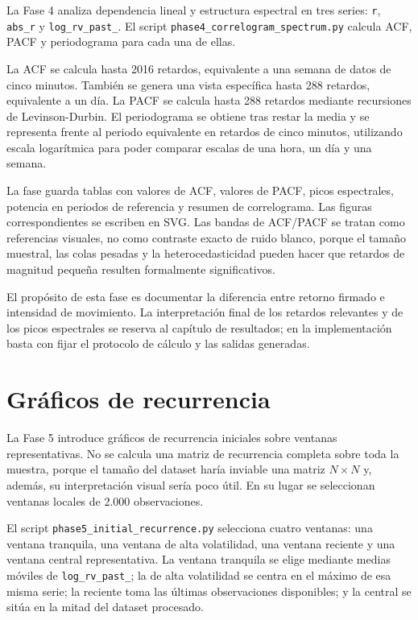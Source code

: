 La Fase 4 analiza dependencia lineal y estructura espectral en tres series: \texttt{r}, \texttt{abs\_\allowbreak r} y \texttt{log\_\allowbreak rv\_\allowbreak past\_}. El script \texttt{phase4\_\allowbreak correlogram\_\allowbreak spectrum.py} calcula ACF, PACF y periodograma para cada una de ellas.

La ACF se calcula hasta 2016 retardos, equivalente a una semana de datos de cinco minutos. También se genera una vista específica hasta 288 retardos, equivalente a un día. La PACF se calcula hasta 288 retardos mediante recursiones de Levinson-Durbin. El periodograma se obtiene tras restar la media y se representa frente al periodo equivalente en retardos de cinco minutos, utilizando escala logarítmica para poder comparar escalas de una hora, un día y una semana.

La fase guarda tablas con valores de ACF, valores de PACF, picos espectrales, potencia en periodos de referencia y resumen de correlograma. Las figuras correspondientes se escriben en SVG. Las bandas de ACF/PACF se tratan como referencias visuales, no como contraste exacto de ruido blanco, porque el tamaño muestral, las colas pesadas y la heterocedasticidad pueden hacer que retardos de magnitud pequeña resulten formalmente significativos.

El propósito de esta fase es documentar la diferencia entre retorno firmado e intensidad de movimiento. La interpretación final de los retardos relevantes y de los picos espectrales se reserva al capítulo de resultados; en la implementación basta con fijar el protocolo de cálculo y las salidas generadas.

\section{Gráficos de recurrencia}\label{sec:graficos-recurrencia}

La Fase 5 introduce gráficos de recurrencia iniciales sobre ventanas representativas. No se calcula una matriz de recurrencia completa sobre toda la muestra, porque el tamaño del dataset haría inviable una matriz \(N \times N\) y, además, su interpretación visual sería poco útil. En su lugar se seleccionan ventanas locales de 2.000 observaciones.

El script \texttt{phase5\_\allowbreak initial\_\allowbreak recurrence.py} selecciona cuatro ventanas: una ventana tranquila, una ventana de alta volatilidad, una ventana reciente y una ventana central representativa. La ventana tranquila se elige mediante medias móviles de \texttt{log\_\allowbreak rv\_\allowbreak past\_}; la de alta volatilidad se centra en el máximo de esa misma serie; la reciente toma las últimas observaciones disponibles; y la central se sitúa en la mitad del dataset procesado.

